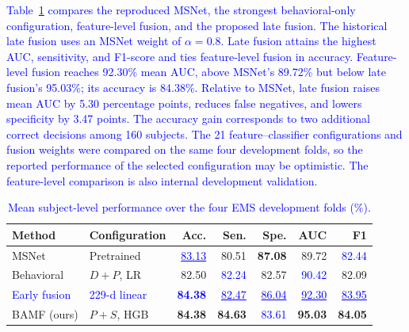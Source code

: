 \documentclass[conference,a4paper]{IEEEtran}
\begin{document}
\textcolor{blue}{Table~\ref{tab:main_results} compares the reproduced MSNet, the strongest behavioral-only configuration, feature-level fusion, and the proposed late fusion.} \textcolor{blue}{The historical late fusion uses an MSNet weight of $\alpha=0.8$.} \textcolor{blue}{Late fusion attains the highest AUC, sensitivity, and F1-score and ties feature-level fusion in accuracy.} \textcolor{blue}{Feature-level fusion reaches 92.30\% mean AUC, above MSNet's 89.72\% but below late fusion's 95.03\%; its accuracy is 84.38\%. Relative to MSNet, late fusion raises mean AUC by 5.30 percentage points, reduces false negatives, and lowers specificity by 3.47 points. The accuracy gain corresponds to two additional correct decisions among 160 subjects. The 21 feature--classifier configurations and fusion weights were compared on the same four development folds, so the reported performance of the selected configuration may be optimistic. The feature-level comparison is also internal development validation.}



\begin{table}[t]
\caption{\textcolor{blue}{Mean subject-level performance over the four EMS development folds (\%).}}
\label{tab:main_results}
\centering
\footnotesize
\setlength{\tabcolsep}{3pt}
\begin{tabular}{@{}llrrrrr@{}}
\toprule
Method & Configuration & Acc. & Sen. & Spe. & AUC &  F1 \\
\midrule
MSNet & Pretrained & \textcolor{blue}{\underline{83.13}} & 80.51 & \textbf{87.08} & 89.72 & \textcolor{blue}{82.44} \\
Behavioral & $D+P$, LR & 82.50 & \textcolor{blue}{82.24} & 82.57 & \textcolor{blue}{90.42} & 82.09 \\
\textcolor{blue}{Early fusion} & \textcolor{blue}{229-d linear} & \textcolor{blue}{\textbf{84.38}} & \textcolor{blue}{\underline{82.47}} & \textcolor{blue}{\underline{86.04}} & \textcolor{blue}{\underline{92.30}} & \textcolor{blue}{\underline{83.95}} \\
BAMF (ours) & $P+S$, HGB & \textbf{84.38} & \textbf{84.63} & \textcolor{blue}{83.61} & \textbf{95.03} &  \textbf{84.05} \\
\bottomrule
\end{tabular}
\end{table}
\end{document}
